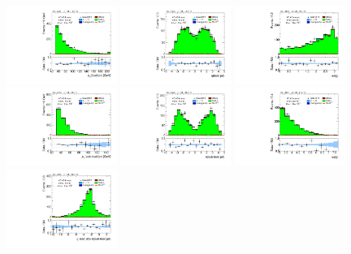 \begin{figure}[tp]
  \includegraphics[width=0.32\textwidth]{figures/analysis/vbf-SSXCR/jet-1-pt}
  \includegraphics[width=0.32\textwidth]{figures/analysis/vbf-SSXCR/jet-1-eta}
  \includegraphics[width=0.32\textwidth]{figures/analysis/vbf-SSXCR/jets-dphi}
  \includegraphics[width=0.32\textwidth]{figures/analysis/vbf-SSXCR/jet-2-pt}
  \includegraphics[width=0.32\textwidth]{figures/analysis/vbf-SSXCR/jet-2-eta}
  \includegraphics[width=0.32\textwidth]{figures/analysis/vbf-SSXCR/jets-deta}
  \includegraphics[width=0.32\textwidth]{figures/analysis/vbf-SSXCR/jets-etaprod}

\end{figure}
